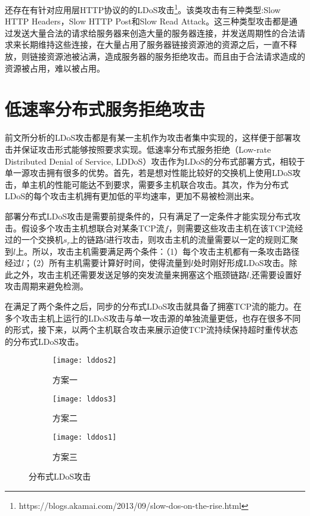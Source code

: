 还存在有针对应用层HTTP协议的的LDoS攻击\footnote{https://blogs.akamai.com/2013/09/slow-dos-on-the-rise.html}。该类攻击有三种类型:Slow HTTP Headers，Slow HTTP Post和Slow Read Attack。这三种类型攻击都是通过发送大量合法的请求给服务器来创造大量的服务器连接，并发送周期性的合法请求来长期维持这些连接，在大量占用了服务器链接资源池的资源之后，一直不释放，则链接资源池被沾满，造成服务器的服务拒绝攻击。而且由于合法请求造成的资源被占用，难以被占用。

\section{低速率分布式服务拒绝攻击}
前文所分析的LDoS攻击都是有某一主机作为攻击者集中实现的，这样便于部署攻击并保证攻击形式能够按照要求实现。低速率分布式服务拒绝（Low-rate Distributed Denial of Service, LDDoS）攻击作为LDoS的分布式部署方式，相较于单一源攻击拥有很多的优势。首先，若是想对性能比较好的交换机上使用LDoS攻击，单主机的性能可能达不到要求，需要多主机联合攻击。其次，作为分布式LDoS的每个攻击主机拥有更加低的平均速率，更加不易被检测出来。

部署分布式LDoS攻击是需要前提条件的，只有满足了一定条件才能实现分布式攻击。假设多个攻击主机想联合对某条TCP流$f$，则需要这些攻击主机在该TCP流经过的一个交换机$s_r$上的链路$l$进行攻击，则攻击主机的流量需要以一定的规则汇聚到$l$上。所以，攻击主机需要满足两个条件：（1）每个攻击主机都有一条攻击路径经过$l$；（2）所有主机需要计算好时间，使得流量到$l$处时刚好形成LDoS攻击。除此之外，攻击主机还需要发送足够的突发流量来拥塞这个瓶颈链路$l$,还需要设置好攻击周期来避免检测。

在满足了两个条件之后，同步的分布式LDoS攻击就具备了拥塞TCP流的能力。在多个攻击主机上运行的LDoS攻击与单一攻击源的单独流量更低，也存在很多不同的形式，接下来，以两个主机联合攻击来展示迫使TCP流持续保持超时重传状态的分布式LDoS攻击。


\begin{figure}
    \vspace{-0.2in}
    \begin{subfigure}{1\textwidth}
        \centering
        \texttt{[image: lddos2]}
        \caption{方案一}
        \label{fig:lldos1}
    \end{subfigure}

    \begin{subfigure}{1\textwidth}
        \centering
        \texttt{[image: lddos3]}
        \caption{方案二}
        \label{fig:lldos2}
    \end{subfigure}

    \begin{subfigure}{1\textwidth}
        \centering
        \texttt{[image: lddos1]}
        \caption{方案三}
        \label{fig:lldos3}
    \end{subfigure}


    \caption{分布式LDoS攻击}
    \label{ffig:lldos}
\end{figure}


